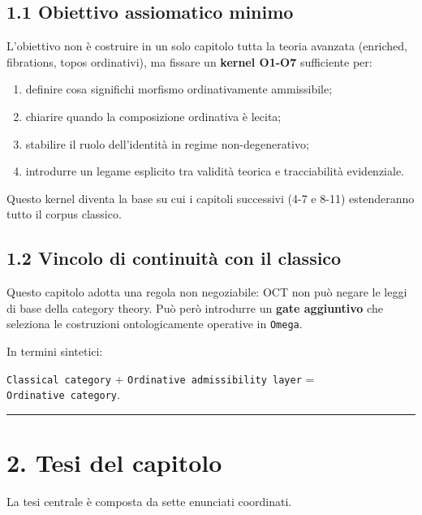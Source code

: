 \subsection{1.1 Obiettivo assiomatico minimo}

L'obiettivo non è costruire in un solo capitolo tutta la teoria avanzata (enriched, fibrations, topos ordinativi), ma fissare un \textbf{kernel O1-O7} sufficiente per:

\begin{enumerate}
\def\labelenumi{\arabic{enumi}.}
\tightlist
\item
  definire cosa significhi morfismo ordinativamente ammissibile;
\item
  chiarire quando la composizione ordinativa è lecita;
\item
  stabilire il ruolo dell'identità in regime non-degenerativo;
\item
  introdurre un legame esplicito tra validità teorica e tracciabilità evidenziale.
\end{enumerate}

Questo kernel diventa la base su cui i capitoli successivi (4-7 e 8-11) estenderanno tutto il corpus classico.

\subsection{1.2 Vincolo di continuità con il classico}

Questo capitolo adotta una regola non negoziabile: OCT non può negare le leggi di base della category theory. Può però introdurre un \textbf{gate aggiuntivo} che seleziona le costruzioni ontologicamente operative in \texttt{Omega}.

In termini sintetici:

\texttt{Classical\ category} + \texttt{Ordinative\ admissibility\ layer} = \texttt{Ordinative\ category}.

\begin{center}\rule{0.5\linewidth}{0.5pt}\end{center}

\section{2. Tesi del capitolo}

La tesi centrale è composta da sette enunciati coordinati.


